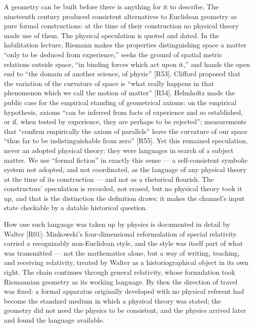 \documentclass[11pt,a4paper]{article}
\begin{document}
A geometry can be built before there is anything for it to describe. The nineteenth century produced consistent alternatives to Euclidean geometry as pure formal constructions: at the time of their construction no physical theory made use of them. The physical speculation is quoted and dated. In the habilitation lecture, Riemann makes the properties distinguishing space a matter ``only to be deduced from experience,'' seeks the ground of spatial metric relations outside space, ``in binding forces which act upon it,'' and hands the open end to ``the domain of another science, of physic'' [R53]. Clifford proposed that the variation of the curvature of space is ``what really happens in that phenomenon which we call the motion of matter'' [R54]. Helmholtz made the public case for the empirical standing of geometrical axioms: on the empirical hypothesis, axioms ``can be inferred from facts of experience and so established, or if, when tested by experience, they are perhaps to be rejected''; measurements that ``confirm empirically the axiom of parallels'' leave the curvature of our space ``thus far to be indistinguishable from zero'' [R55]. Yet this remained speculation, never an adopted physical theory: they were languages in search of a subject matter. We use ``formal fiction'' in exactly this sense — a self-consistent symbolic system not adopted, and not coordinated, as the language of any physical theory at the time of its construction — and not as a rhetorical flourish. The constructors' speculation is recorded, not erased, but no physical theory took it up, and that is the distinction the definition draws; it makes the channel's input state checkable by a datable historical question.

How one such language was taken up by physics is documented in detail by Walter [R01]: Minkowski's four-dimensional reformulation of special relativity carried a recognizably non-Euclidean style, and the style was itself part of what was transmitted — not the mathematics alone, but a way of writing, teaching, and receiving relativity, treated by Walter as a historiographical object in its own right. The chain continues through general relativity, whose formulation took Riemannian geometry as its working language. By then the direction of travel was fixed: a formal apparatus originally developed with no physical referent had become the standard medium in which a physical theory was stated; the geometry did not need the physics to be consistent, and the physics arrived later and found the language available.
\end{document}
